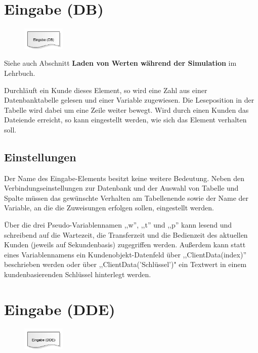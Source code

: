 \section{Eingabe (DB)}
\label{ref:ModelElementInputDB}

\begin{figure}
\vspace{-22pt}
\includegraphics[width=2cm]{imageModelElementInputDB.png}
\vspace{-22pt}
\end{figure}

Siehe auch Abschnitt \textbf{Laden von Werten während der Simulation} im Lehrbuch.

Durchläuft ein Kunde dieses Element, so wird eine Zahl aus einer Datenbanktabelle gelesen und einer
Variable zugewiesen. Die Leseposition in der Tabelle wird dabei um eine Zeile weiter bewegt.
Wird durch einen Kunden das Dateiende erreicht, so kann eingestellt werden, wie sich
das Element verhalten soll.

\subsection*{Einstellungen}

Der Name des Eingabe-Elements besitzt keine weitere Bedeutung. Neben den Verbindungseinstellungen
zur Datenbank und der Auswahl von Tabelle und Spalte müssen das gewünschte Verhalten am Tabellenende
sowie der Name der Variable, an die die Zuweisungen erfolgen sollen, eingestellt werden.

Über die drei Pseudo-Variablennamen ,,w'', ,,t'' und ,,p'' kann lesend und schreibend auf die Wartezeit, die Transferzeit
und die Bedienzeit des aktuellen Kunden (jeweils auf Sekundenbasis) zugegriffen werden. Außerdem kann statt eines
Variablennamens ein Kundenobjekt-Datenfeld über ,,ClientData(index)'' beschrieben werden oder über ,,ClientData('Schlüssel')"
ein Textwert in einem kundenbasierenden Schlüssel hinterlegt werden.


\section{Eingabe (DDE)}
\label{ref:ModelElementInputDDE}

\begin{figure}
\vspace{-22pt}
\includegraphics[width=2cm]{imageModelElementInputDDE.png}
\vspace{-22pt}
\end{figure}

